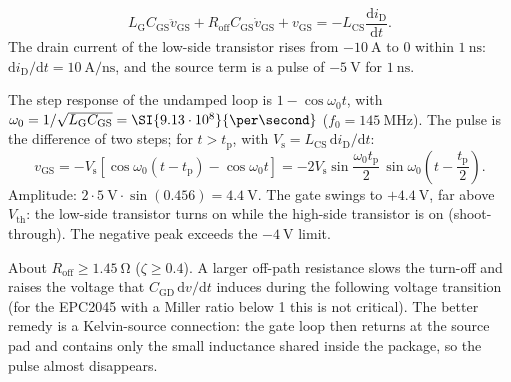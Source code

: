 \begin{solutionblock}
	\begin{equation}
		L_\mathrm{G}C_\mathrm{GS}\ddot{v}_\mathrm{GS}+R_\mathrm{off}C_\mathrm{GS}\dot{v}_\mathrm{GS}+v_\mathrm{GS}=-L_\mathrm{CS}\frac{\mathrm{d}i_\mathrm{D}}{\mathrm{d}t}.
	\end{equation}
	The drain current of the low-side transistor rises from $\SI{-10}{\ampere}$ to $0$ within $\SI{1}{\nano\second}$: $\mathrm{d}i_\mathrm{D}/\mathrm{d}t=\SI{10}{\ampere\per\nano\second}$, and the source term is a pulse of $\SI{-5}{\volt}$ for $\SI{1}{\nano\second}$.
\end{solutionblock}


\begin{solutionblock}
	The step response of the undamped loop is $1-\cos\omega_0t$, with $\omega_0=1/\sqrt{L_\mathrm{G}C_\mathrm{GS}}=\SI{9.13 \cdot 10^{8}}{\per\second}$ ($f_0=\SI{145}{\mega\hertz}$). The pulse is the difference of two steps; for $t>t_\mathrm{p}$, with $V_\mathrm{s}=L_\mathrm{CS}\,\mathrm{d}i_\mathrm{D}/\mathrm{d}t$:
	\begin{equation}
		v_\mathrm{GS}=-V_\mathrm{s}\left[\cos\omega_0(t-t_\mathrm{p})-\cos\omega_0t\right]=-2V_\mathrm{s}\sin\frac{\omega_0t_\mathrm{p}}{2}\,\sin\omega_0\!\left(t-\frac{t_\mathrm{p}}{2}\right).
	\end{equation}
	Amplitude: $2\cdot\SI{5}{\volt}\cdot\sin(0.456)=\SI{4.4}{\volt}$. The gate swings to $+\SI{4.4}{\volt}$, far above $V_\mathrm{th}$: the low-side transistor turns on while the high-side transistor is on (shoot-through). The negative peak exceeds the $\SI{-4}{\volt}$ limit.
\end{solutionblock}


\begin{solutionblock}
	About $R_\mathrm{off}\geq\SI{1.45}{\ohm}$ ($\zeta\geq0.4$). A larger off-path resistance slows the turn-off and raises the voltage that $C_\mathrm{GD}\,\mathrm{d}v/\mathrm{d}t$ induces during the following voltage transition (for the EPC2045 with a Miller ratio below 1 this is not critical). The better remedy is a Kelvin-source connection: the gate loop then returns at the source pad and contains only the small inductance shared inside the package, so the pulse almost disappears.
\end{solutionblock}

